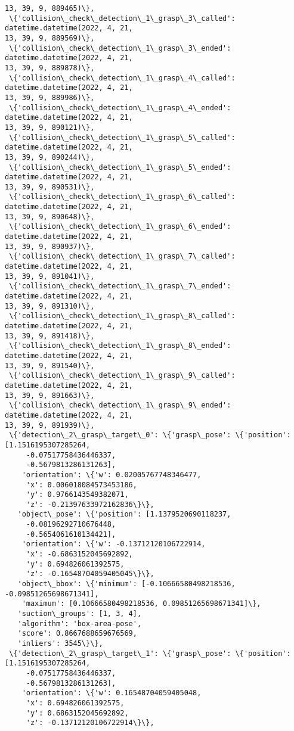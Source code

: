 \documentclass[11pt]{article}
\begin{document}
\begin{tcolorbox}[breakable, size=fbox, boxrule=.5pt, pad at break*=1mm, opacityfill=0]
\begin{Verbatim}[commandchars=\\\{\}]
13, 39, 9, 889465)\},
 \{'collision\_check\_detection\_1\_grasp\_3\_called': datetime.datetime(2022, 4, 21,
13, 39, 9, 889569)\},
 \{'collision\_check\_detection\_1\_grasp\_3\_ended': datetime.datetime(2022, 4, 21,
13, 39, 9, 889878)\},
 \{'collision\_check\_detection\_1\_grasp\_4\_called': datetime.datetime(2022, 4, 21,
13, 39, 9, 889986)\},
 \{'collision\_check\_detection\_1\_grasp\_4\_ended': datetime.datetime(2022, 4, 21,
13, 39, 9, 890121)\},
 \{'collision\_check\_detection\_1\_grasp\_5\_called': datetime.datetime(2022, 4, 21,
13, 39, 9, 890244)\},
 \{'collision\_check\_detection\_1\_grasp\_5\_ended': datetime.datetime(2022, 4, 21,
13, 39, 9, 890531)\},
 \{'collision\_check\_detection\_1\_grasp\_6\_called': datetime.datetime(2022, 4, 21,
13, 39, 9, 890648)\},
 \{'collision\_check\_detection\_1\_grasp\_6\_ended': datetime.datetime(2022, 4, 21,
13, 39, 9, 890937)\},
 \{'collision\_check\_detection\_1\_grasp\_7\_called': datetime.datetime(2022, 4, 21,
13, 39, 9, 891041)\},
 \{'collision\_check\_detection\_1\_grasp\_7\_ended': datetime.datetime(2022, 4, 21,
13, 39, 9, 891310)\},
 \{'collision\_check\_detection\_1\_grasp\_8\_called': datetime.datetime(2022, 4, 21,
13, 39, 9, 891418)\},
 \{'collision\_check\_detection\_1\_grasp\_8\_ended': datetime.datetime(2022, 4, 21,
13, 39, 9, 891540)\},
 \{'collision\_check\_detection\_1\_grasp\_9\_called': datetime.datetime(2022, 4, 21,
13, 39, 9, 891663)\},
 \{'collision\_check\_detection\_1\_grasp\_9\_ended': datetime.datetime(2022, 4, 21,
13, 39, 9, 891939)\},
 \{'detection\_2\_grasp\_target\_0': \{'grasp\_pose': \{'position': [1.1516195307285264,
     -0.07517758436446337,
     -0.5679813286131263],
    'orientation': \{'w': 0.02005767748346477,
     'x': 0.006018084573453186,
     'y': 0.9766143549382071,
     'z': -0.21397633972162836\}\},
   'object\_pose': \{'position': [1.1379520690118237,
     -0.08196292710676448,
     -0.5654061610134421],
    'orientation': \{'w': -0.13712120106722914,
     'x': -0.6863152045692892,
     'y': 0.694826061392575,
     'z': -0.16548704059405045\}\},
   'object\_bbox': \{'minimum': [-0.10666580498218536, -0.09851265698671341],
    'maximum': [0.10666580498218536, 0.09851265698671341]\},
   'suction\_groups': [1, 3, 4],
   'algorithm': 'box-area-pose',
   'score': 0.8667688659676569,
   'inliers': 3545\}\},
 \{'detection\_2\_grasp\_target\_1': \{'grasp\_pose': \{'position': [1.1516195307285264,
     -0.07517758436446337,
     -0.5679813286131263],
    'orientation': \{'w': 0.16548704059405048,
     'x': 0.694826061392575,
     'y': 0.6863152045692892,
     'z': -0.13712120106722914\}\},

\end{Verbatim}
\end{tcolorbox}
\end{document}
